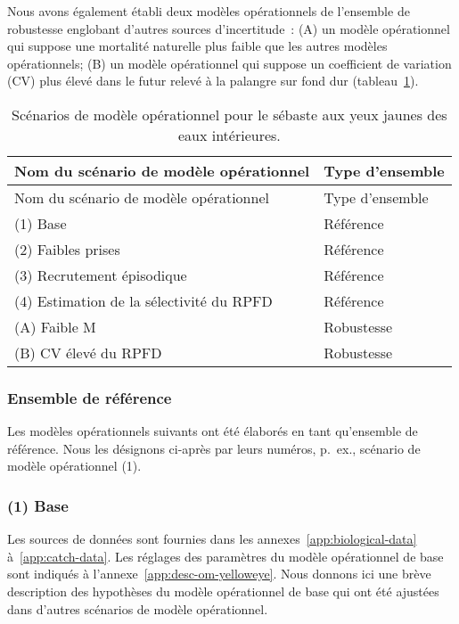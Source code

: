 \documentclass[french,11pt]{book}
\begin{document}
Nous avons également établi deux modèles opérationnels de l'ensemble de robustesse englobant d'autres sources d'incertitude~: (A) un modèle opérationnel qui suppose une mortalité naturelle plus faible que les autres modèles opérationnels; (B) un modèle opérationnel qui suppose un coefficient de variation (CV) plus élevé dans le futur relevé à la palangre sur fond dur (tableau~\ref{tab:ye-scen}).
\begin{longtable}[]{@{}ll@{}}
\caption{\label{tab:ye-scen}Scénarios de modèle opérationnel pour le sébaste aux yeux jaunes des eaux intérieures.}\tabularnewline
\toprule
Nom du scénario de modèle opérationnel & Type d'ensemble \\
\midrule
\endfirsthead
\toprule
Nom du scénario de modèle opérationnel & Type d'ensemble \\
\midrule
\endhead
(1) Base & Référence \\
(2) Faibles prises & Référence \\
(3) Recrutement épisodique & Référence \\
(4) Estimation de la sélectivité du RPFD & Référence \\
(A) Faible M & Robustesse \\
(B) CV élevé du RPFD & Robustesse \\
\bottomrule
\end{longtable}
\hypertarget{sec:approach3-reference}{%
\subsubsection{Ensemble de référence}\label{sec:approach3-reference}}

Les modèles opérationnels suivants ont été élaborés en tant qu'ensemble de référence. Nous les désignons ci-après par leurs numéros, p.~ex., scénario de modèle opérationnel (1).

\hypertarget{sec:approach3-reference1}{%
\subsubsection{(1) Base}\label{sec:approach3-reference1}}

Les sources de données sont fournies dans les annexes~\ref{app:biological-data} à~\ref{app:catch-data}. Les réglages des paramètres du modèle opérationnel de base sont indiqués à l'annexe~\ref{app:desc-om-yelloweye}. Nous donnons ici une brève description des hypothèses du modèle opérationnel de base qui ont été ajustées dans d'autres scénarios de modèle opérationnel.
\end{document}
